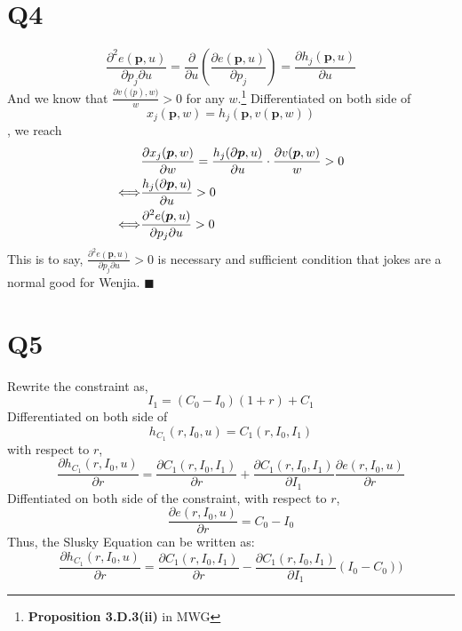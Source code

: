 \documentclass{article}
\begin{document}
\section{Q4}
\begin{equation}
	\frac{\partial^2 e(\bm{p},u)}{\partial p_{j} \partial u} = \frac{\partial}{\partial u}(\frac{\partial e(\bm{p},u)}{\partial p_{j}}) = \frac{\partial h_j(\bm{p},u)}{\partial u}
\end{equation}
And we know that $\frac{\partial v(\bm(p),w)}{w}>0$ for any $w$.\footnote{{\bf Proposition 3.D.3(ii)} in MWG}
Differentiated on both side of 
\begin{equation}
	x_j (\bm{p},w) = h_j (\bm{p}, v(\bm{p},w))
\end{equation}
, we reach
\begin{align}	\notag
	&\frac{\partial x_{j}(\bm{p},w)}{\partial w} = \frac{h_j (\partial \bm{p}, u)}{\partial u}\cdot \frac{\partial v(\bm{p},w)}{w} > 0 \\ \notag
	\Longleftrightarrow &\frac{h_j (\partial \bm{p}, u)}{\partial u}>0 \\ \notag
	\Longleftrightarrow &\frac{\partial^2 e(\bm{p},u)}{\partial p_{j} \partial u} >0
\end{align}
This is to say, $\frac{\partial^2 e(\bm{p},u)}{\partial p_{j} \partial u} >0$ is necessary and sufficient condition that jokes are a normal good for Wenjia. $\blacksquare$

\section{Q5}
Rewrite the constraint as,
\begin{equation}
	I_{1} = (C_{0}-I_{0}) (1+r)+C_1
\end{equation}
Differentiated on both side of 
\begin{equation}
	h_{C_1}(r,I_0,u) = C_1 (r, I_0, I_1)
\end{equation}
with respect to $r$,
\begin{equation}
	\frac{\partial h_{C_1}(r,I_0,u)}{\partial r} =\frac{\partial C_1 (r, I_0, I_1)} {\partial r} + \frac{\partial C_1 (r, I_0, I_1)} {\partial I_1}  \frac{\partial e(r, I_0, u)}{\partial r}
\end{equation}
Diffentiated on both side of the constraint, with respect to $r$,
\begin{equation}
	\frac{\partial e(r, I_0, u)}{\partial r} = C_0 - I_0
\end{equation}
Thus, the Slusky Equation can be written as:
\begin{equation}
	\frac{\partial h_{C_1}(r,I_0,u)}{\partial r} = \frac{\partial C_1 (r, I_0, I_1)} {\partial r} - \frac{\partial C_1 (r, I_0, I_1)} {\partial I_1}  (I_0-C_0))
\end{equation}
\end{document}
